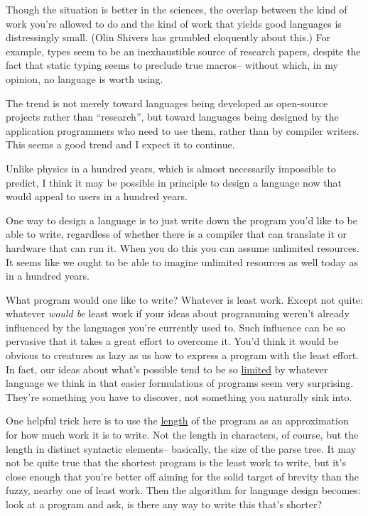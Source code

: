 Though the situation is better in the sciences, the overlap between the
kind of work you're allowed to do and the kind of work that yields good
languages is distressingly small. (Olin Shivers has grumbled eloquently
about this.) For example, types seem to be an inexhaustible source of
research papers, despite the fact that static typing seems to preclude
true macros-- without which, in my opinion, no language is worth using.

The trend is not merely toward languages being developed as open-source
projects rather than ``research'', but toward languages being designed
by the application programmers who need to use them, rather than by
compiler writers. This seems a good trend and I expect it to continue.

Unlike physics in a hundred years, which is almost necessarily
impossible to predict, I think it may be possible in principle to design
a language now that would appeal to users in a hundred years.

One way to design a language is to just write down the program you'd
like to be able to write, regardless of whether there is a compiler that
can translate it or hardware that can run it. When you do this you can
assume unlimited resources. It seems like we ought to be able to imagine
unlimited resources as well today as in a hundred years.

What program would one like to write? Whatever is least work. Except not
quite: whatever \emph{would be} least work if your ideas about
programming weren't already influenced by the languages you're currently
used to. Such influence can be so pervasive that it takes a great effort
to overcome it. You'd think it would be obvious to creatures as lazy as
us how to express a program with the least effort. In fact, our ideas
about what's possible tend to be so \href{avg.html}{limited} by whatever
language we think in that easier formulations of programs seem very
surprising. They're something you have to discover, not something you
naturally sink into.

One helpful trick here is to use the \href{power.html}{length} of the
program as an approximation for how much work it is to write. Not the
length in characters, of course, but the length in distinct syntactic
elements-- basically, the size of the parse tree. It may not be quite
true that the shortest program is the least work to write, but it's
close enough that you're better off aiming for the solid target of
brevity than the fuzzy, nearby one of least work. Then the algorithm for
language design becomes: look at a program and ask, is there any way to
write this that's shorter?

